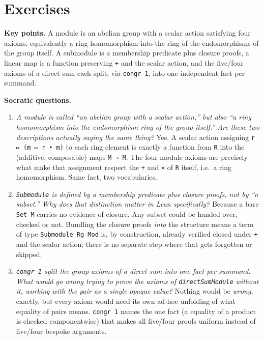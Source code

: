 \section{Exercises}\label{sec:11-modules:07-exercises:1}

\textbf{Key points.} A module is an abelian group with a scalar action satisfying four axioms, equivalently a ring homomorphism into the ring of the endomorphisms of the group itself. A submodule is a membership predicate plus closure proofs, a linear map is a function preserving \texttt{+} and the scalar action, and the five/four axioms of a direct sum each split, via \texttt{congr 1}, into one independent fact per summand.

\textbf{Socratic questions.}

\begin{enumerate}
\def\labelenumi{\arabic{enumi}.}
\item
  \emph{A module is called ``an abelian group with a scalar action,'' but also ``a ring homomorphism into the endomorphism ring of the group itself.'' Are these two descriptions actually saying the same thing?} Yes. A scalar action assigning \texttt{r ↦ (m ↦ r • m)} to each ring element is exactly a function from \texttt{R} into the (additive, composable) maps \texttt{M → M}. The four module axioms are precisely what make that assignment respect the \texttt{+} and \texttt{×} of \texttt{R} itself, i.e.~a ring homomorphism. Same fact, two vocabularies.
\item
  \emph{\texttt{Submodule} is defined by a membership predicate plus closure proofs, not by ``a subset.'' Why does that distinction matter in Lean specifically?} Because a bare \texttt{Set M} carries no evidence of closure. Any subset could be handed over, checked or not. Bundling the closure proofs \emph{into} the structure means a term of type \texttt{Submodule Rg Mod} is, by construction, already verified closed under \texttt{+} and the scalar action; there is no separate step where that gets forgotten or skipped.
\item
  \emph{\texttt{congr 1} split the group axioms of a direct sum into one fact per summand. What would go wrong trying to prove the axioms of \texttt{directSumModule} without it, working with the pair as a single opaque value?} Nothing would be \emph{wrong}, exactly, but every axiom would need its own ad-hoc unfolding of what equality of pairs means. \texttt{congr 1} names the one fact (a equality of a product is checked componentwise) that makes all five/four proofs uniform instead of five/four bespoke arguments.

\end{enumerate}
